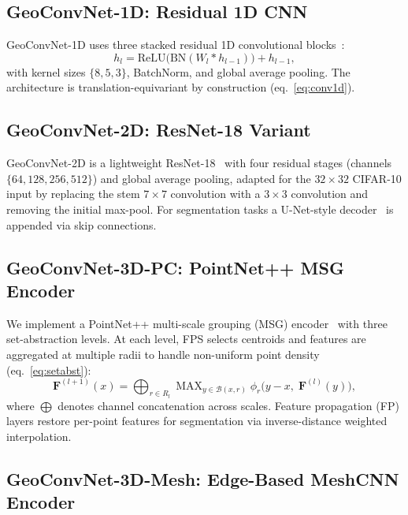 \documentclass[10pt,conference]{IEEEtran}
\newcommand{\bF}{\mathbf{F}}
\DeclareMathOperator{\MAX}{MAX}
\begin{document}
\subsection{GeoConvNet-1D: Residual 1D CNN}

GeoConvNet-1D uses three stacked residual 1D convolutional
blocks~\cite{he2016deep}:
\begin{equation}
  h_l = \mathrm{ReLU}\!\bigl(\mathrm{BN}(W_l * h_{l-1})\bigr) + h_{l-1},
\end{equation}
with kernel sizes $\{8,5,3\}$, BatchNorm, and global average pooling.
The architecture is translation-equivariant by construction
(eq.~\ref{eq:conv1d}).

\subsection{GeoConvNet-2D: ResNet-18 Variant}

GeoConvNet-2D is a lightweight ResNet-18~\cite{he2016deep} with four
residual stages (channels $\{64,128,256,512\}$) and global average pooling,
adapted for the $32{\times}32$ CIFAR-10 input by replacing the stem
$7{\times}7$ convolution with a $3{\times}3$ convolution and removing the
initial max-pool. For segmentation tasks a U-Net-style
decoder~\cite{ronneberger2015unet} is appended via skip connections.

\subsection{GeoConvNet-3D-PC: PointNet++ MSG Encoder}

We implement a PointNet++ multi-scale grouping (MSG)
encoder~\cite{qi2017pointnetplusplus} with three set-abstraction levels.
At each level, FPS selects centroids and features are aggregated at
multiple radii to handle non-uniform point density (eq.~\ref{eq:setabst}):
\begin{equation}
  \bF^{(l+1)}(x)
    = \bigoplus_{r\in R_l}
      \MAX_{y\in\mathcal{B}(x,r)} \phi_r\!\bigl(y-x,\;\bF^{(l)}(y)\bigr),
\end{equation}
where $\bigoplus$ denotes channel concatenation across scales. Feature
propagation (FP) layers restore per-point features for segmentation via
inverse-distance weighted interpolation.

\subsection{GeoConvNet-3D-Mesh: Edge-Based MeshCNN Encoder}
\end{document}
